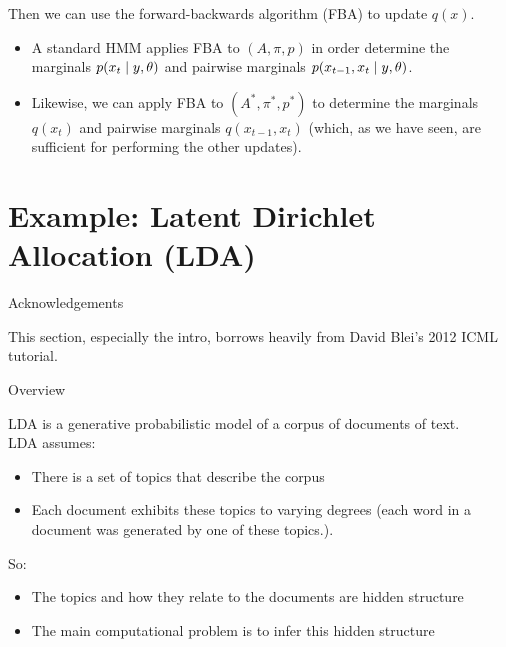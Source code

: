 \documentclass[10pt]{beamer}
\begin{document}
{\begin{frame}
Then we can use the forward-backwards algorithm (FBA) to update $q(x)$.
\begin{itemize}
\item A standard HMM applies FBA to $(A, \pi, p)$ in order determine the marginals $p(x_t \; | \; y, \theta)$ and pairwise marginals $p(x_{t-1},x_t \; | \; y, \theta)$.
\item Likewise, we can apply FBA to $(A^*, \pi^*, p^*)$ to determine the marginals $q(x_t)$ and pairwise marginals $q(x_{t-1}, x_t)$ \tiny (which, as we have seen, are sufficient for performing the other updates).
\end{itemize}

\end{frame}
}

\section{Example: Latent Dirichlet Allocation (LDA)}

\begin{frame}{Acknowledgements}

This section, especially the intro, borrows heavily from David Blei's 2012 ICML tutorial. 

\end{frame}


\begin{frame}{Overview}

LDA is a generative probabilistic model of a corpus of documents of text.  \\
\vfill
LDA assumes:

\begin{itemize}
\item There is a set of topics that describe the corpus
\item Each document exhibits these topics to varying degrees  (each word in a document was generated by one of these topics.).
\end{itemize}
\vfill
So:
\begin{itemize}
\item The topics and how they relate to the documents are hidden structure
\item The main computational problem is to infer this hidden structure 
\end{itemize}
\end{frame}
\end{document}
